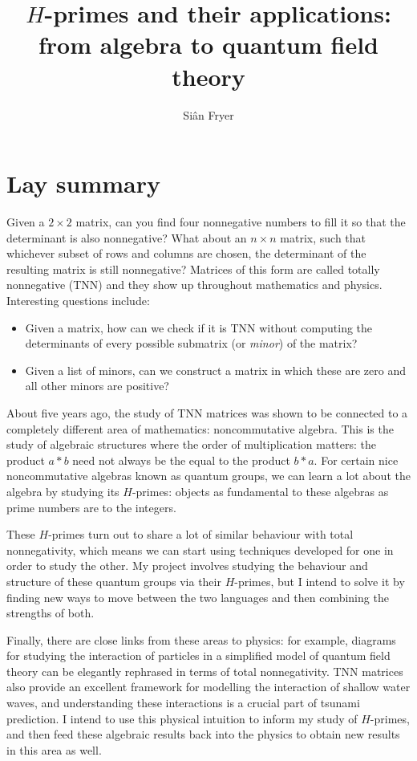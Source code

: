 \documentclass[11pt]{amsart}
\theoremstyle{definition}
\numberwithin{equation}{theorem}
\begin{document}
\title{$H$-primes and their applications: from algebra to quantum field theory}
\author{Si\^an Fryer}
\maketitle

\vspace{-2em}
\section{Lay summary}

Given a $2\times 2$ matrix, can you find four nonnegative numbers to fill it so that the determinant is also nonnegative? What about an $n \times n$ matrix, such that whichever subset of rows and columns are chosen, the determinant of the resulting matrix is still nonnegative?  Matrices of this form are called totally nonnegative (TNN) and they show up throughout mathematics and physics.  Interesting questions include:

\begin{itemize}
\item Given a matrix, how can we check if it is TNN without computing the determinants of every possible submatrix (or \textit{minor}) of the matrix?
\item Given a list of minors, can we construct a matrix in which these are zero and all other minors are positive?
\end{itemize}

About five years ago, the study of TNN matrices was shown to be connected to a completely different area of mathematics: noncommutative algebra.  This is the study of algebraic structures where the order of multiplication matters: the product $a*b$ need not always be the equal to the product $b*a$. For certain nice noncommutative algebras known as quantum groups, we can learn a lot about the algebra by studying its $H$-primes: objects as fundamental to these algebras as prime numbers are to the integers.  

These $H$-primes turn out to share a lot of similar behaviour with total nonnegativity, which means we can start using techniques developed for one in order to study the other.  My project involves studying the behaviour and structure of these quantum groups via their $H$-primes, but I intend to solve it by finding new ways to move between the two languages and then combining the strengths of both.

Finally, there are close links from these areas to physics: for example, diagrams for studying the interaction of particles in a simplified model of quantum field theory can be elegantly rephrased in terms of total nonnegativity.  TNN matrices also provide an excellent framework for modelling the interaction of shallow water waves, and understanding these interactions is a crucial part of tsunami prediction.  I intend to use this physical intuition to inform my study of $H$-primes, and then feed these algebraic results back into the physics to obtain new results in this area as well.
\end{document}
